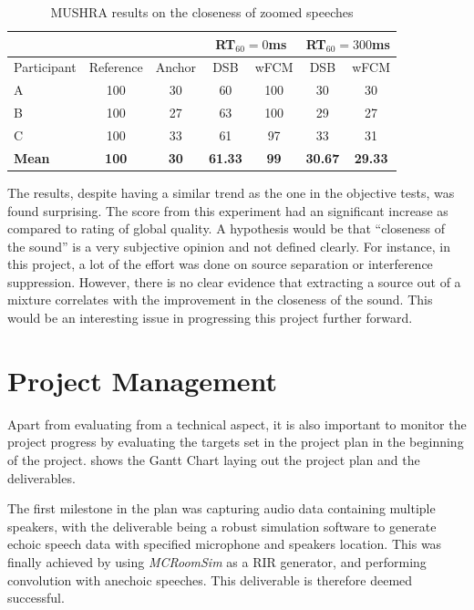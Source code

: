 \documentclass[a4paper,twoside,12pt,hidelinks]{article}
\begin{document}
\begin{table}[H]
\centering
\begin{tabular}{lcc|c|c|c|c|}
\cline{4-7}
 &  &  & \multicolumn{2}{c|}{RT$_{60}=0$ms} & \multicolumn{2}{c|}{RT$_{60}=300$ms} \\ \hline
\multicolumn{1}{|l|}{Participant} & \multicolumn{1}{c|}{Reference} & Anchor & DSB & wFCM & DSB & wFCM \\ \hline
\multicolumn{1}{|l|}{A} & \multicolumn{1}{c|}{100} & 30 & 60 & 100 & 30 & 30 \\ \hline
\multicolumn{1}{|l|}{B} & \multicolumn{1}{c|}{100} & 27 & 63 & 100 & 29 & 27 \\ \hline
\multicolumn{1}{|l|}{C} & \multicolumn{1}{c|}{100} & 33 & 61 & 97 & 33 & 31 \\ \hline
\multicolumn{1}{|l|}{\textbf{Mean}} & \multicolumn{1}{c|}{\textbf{100}} & \textbf{30} & \textbf{61.33} & \textbf{99} & \textbf{30.67} & \textbf{29.33} \\ \hline
\end{tabular}
\caption{MUSHRA results on the closeness of zoomed speeches}
\label{table:closeness}
\end{table}
The results, despite having a similar trend as the one in the objective tests, was found surprising. The score from this experiment had an significant increase as compared to rating of global quality. A hypothesis would be that ``closeness of the sound'' is a very subjective opinion and not defined clearly. For instance, in this project, a lot of the effort was done on source separation or interference suppression. However, there is no clear evidence that extracting a source out of a mixture correlates with the improvement in the closeness of the sound. This would be an interesting issue in progressing this project further forward.

\newpage
\lhead{\itshape\nouppercase{\leftmark}}
\section{Project Management}
\label{sect:projman}
Apart from evaluating from a technical aspect, it is also important to monitor the project progress by evaluating the targets set in the project plan in the beginning of the project.  shows the Gantt Chart laying out the project plan and the deliverables.

The first milestone in the plan was capturing audio data containing multiple speakers, with the deliverable being a robust simulation software to generate echoic speech data with specified microphone and speakers location. This was finally achieved by using \textit{MCRoomSim} as a RIR generator, and performing convolution with anechoic speeches. This deliverable is therefore deemed successful.
\end{document}
